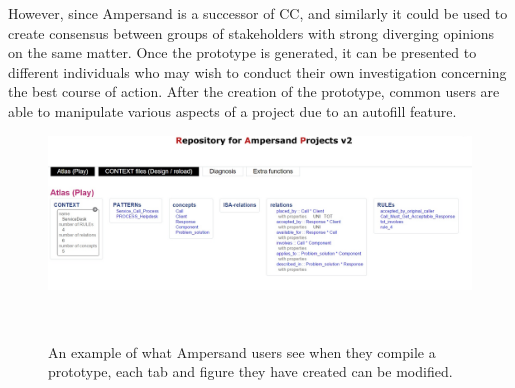 \documentclass[12pt]{report}
\begin{document}
However, since Ampersand is a successor of CC, \cite[p.10]{RBD}
and similarly it could be used to create consensus between groups of stakeholders with strong 
diverging opinions on the same matter. Once the prototype is generated, it can be presented to 
different individuals who may wish to conduct their own investigation concerning the best course of 
action. After the creation of the prototype, common users are able to manipulate various aspects of 
a project due to an autofill feature. 
\begin{figure}
	\centering
	\includegraphics[width=1.0\textwidth]{../figures/Ampersandmodel}
	\caption{An example of what Ampersand users see when they compile a prototype, each tab and 
	figure they have created can be modified.}~\label{fig:figure3}
\end{figure}
\end{document}
